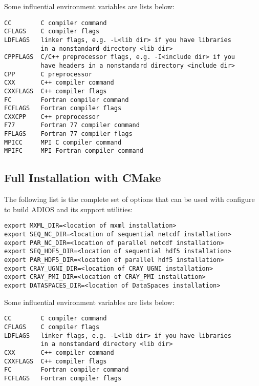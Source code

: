 
Some influential environment variables are lists below:

\begin{lstlisting}
CC        C compiler command
CFLAGS    C compiler flags
LDFLAGS   linker flags, e.g. -L<lib dir> if you have libraries
          in a nonstandard directory <lib dir>
CPPFLAGS  C/C++ preprocessor flags, e.g. -I<include dir> if you
          have headers in a nonstandard directory <include dir>
CPP       C preprocessor
CXX       C++ compiler command
CXXFLAGS  C++ compiler flags
FC        Fortran compiler command
FCFLAGS   Fortran compiler flags
CXXCPP    C++ preprocessor
F77       Fortran 77 compiler command
FFLAGS    Fortran 77 compiler flags
MPICC     MPI C compiler command
MPIFC     MPI Fortran compiler command
\end{lstlisting}

\subsection{Full Installation with CMake}

The following list is the complete set of options that can be used with configure to build ADIOS and its support utilities:

\begin{lstlisting}
export MXML_DIR=<location of mxml installation>
export SEQ_NC_DIR=<location of sequential netcdf installation>
export PAR_NC_DIR=<location of parallel netcdf installation>
export SEQ_HDF5_DIR=<location of sequential hdf5 installation>
export PAR_HDF5_DIR=<location of parallel hdf5 installation>
export CRAY_UGNI_DIR=<location of CRAY UGNI installation>
export CRAY_PMI_DIR=<location of CRAY_PMI installation>
export DATASPACES_DIR=<location of DataSpaces installation>
\end{lstlisting}

Some influential environment variables are lists below:
\begin{lstlisting}
CC        C compiler command
CFLAGS    C compiler flags
LDFLAGS   linker flags, e.g. -L<lib dir> if you have libraries
          in a nonstandard directory <lib dir>
CXX       C++ compiler command
CXXFLAGS  C++ compiler flags
FC        Fortran compiler command
FCFLAGS   Fortran compiler flags
\end{lstlisting}

